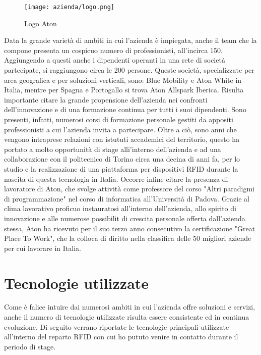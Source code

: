 \begin{figure}[!h] 
    \centering 
    \texttt{[image: azienda/logo.png]} 
    \caption{Logo Aton}
\end{figure}

Data la grande varietà di ambiti in cui l'azienda è impiegata, anche il team che la compone presenta un cospicuo numero di professionisti, all'incirca 150. 
Aggiungendo a questi anche i dipendenti operanti in una rete di società partecipate, si raggiungono circa le 200 persone. 
Queste società, specializzate per area geografica e per soluzioni verticali, sono: ​Blue Mobility e Aton White in Italia,
mentre per Spagna e Portogallo si trova Aton Allspark Iberica.
Risulta importante citare la grande propensione dell'azienda nei confronti dell'innovazione e di una formazione continua per tutti i suoi dipendenti.
Sono presenti, infatti, numerosi corsi di formazione personale gestiti da appositi professionisti a cui l'azienda invita a partecipare. Oltre a ciò,
sono anni che vengono intraprese relazioni con istututi accademici del territorio, questo ha portato a molto opportunità di stage alli'interno dell'azienda
e ad una collaborazione con il politecnico di Torino circa una decina di anni fa, per lo studio e la realizzazione di una piattaforma per dispositivi RFID
durante la nascita di questa tecnologia in Italia. Occorre infine citare la presenza di lavoratore di Aton, che svolge attività come professore del corso
"Altri paradigmi di programmazione" nel corso di informatica all'Università di Padova.
Grazie al clima lavorativo proficuo instauratosi all'interno dell'azienda, allo spirito di innovazione e alle numerose possibilit di crescita personale
offerta dall'azienda stessa, Aton ha ricevuto per il suo terzo anno consecutivo la certificazione "Great Place To Work", che la colloca di diritto
nella classifica delle 50 migliori aziende per cui lavorare in Italia.


\section{Tecnologie utilizzate}

Come è falice intuire dai numerosi ambiti in cui l'azienda offre soluzioni e servizi, anche il numero di tecnologie utilizzate risulta essere consistente
ed in continua evoluzione. Di seguito verrano riportate le tecnologie principali utilizzate all'interno del reparto RFID con cui ho pututo venire in contatto
durante il periodo di stage.

